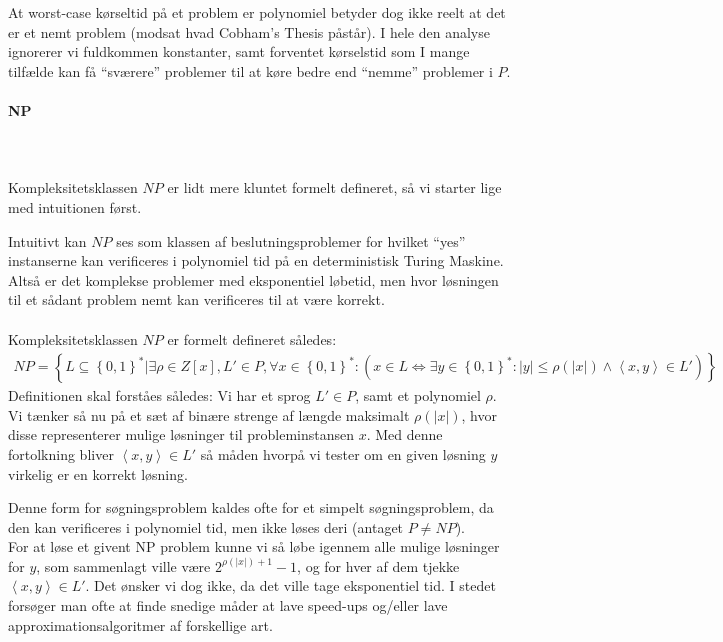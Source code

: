 At worst-case kørseltid på et problem er polynomiel betyder dog ikke reelt at det er et nemt problem (modsat hvad Cobham's Thesis påstår). I hele den analyse ignorerer vi fuldkommen konstanter, samt forventet kørselstid som I mange tilfælde kan få ``sværere'' problemer til at køre bedre end ``nemme'' problemer i $P$.


\paragraph{NP}
~\\
~\\
Kompleksitetsklassen $NP$ er lidt mere kluntet formelt defineret, så vi starter lige med intuitionen først.

Intuitivt kan $NP$ ses som klassen af beslutningsproblemer for hvilket ``yes'' instanserne kan verificeres i polynomiel tid på en deterministisk Turing Maskine. Altså er det komplekse problemer med eksponentiel løbetid, men hvor løsningen til et sådant problem nemt kan verificeres til at være korrekt.\\
~\\
Kompleksitetsklassen $NP$ er formelt defineret således:
\begin{align*}
 NP = \left\lbrace L \subseteq \left\lbrace 0,1 \right\rbrace^* | \exists \rho \in Z[x], L' \in P, \forall x \in \left\lbrace 0,1 \right\rbrace^* : ( x \in L \Leftrightarrow \exists y \in \left\lbrace 0,1 \right\rbrace^* : |y| \leq \rho(|x|) \wedge \left\langle x,y \right\rangle \in L') \right\rbrace
\end{align*}
Definitionen skal forståes således: Vi har et sprog $L' \in P$, samt et polynomiel $\rho$. Vi tænker så nu på et sæt af binære strenge af længde maksimalt $\rho(|x|)$, hvor disse representerer mulige løsninger til probleminstansen $x$. Med denne fortolkning bliver $\left\langle x,y \right\rangle \in L'$ så måden hvorpå vi tester om en given løsning $y$ virkelig er en korrekt løsning. 

Denne form for søgningsproblem kaldes ofte for et simpelt søgningsproblem, da den kan verificeres i polynomiel tid, men ikke løses deri (antaget $P \neq NP$).\\

For at løse et givent NP problem kunne vi så løbe igennem alle mulige løsninger for $y$, som sammenlagt ville være $2^{\rho(|x|)+1}-1$, og for hver af dem tjekke $\left\langle x,y \right\rangle \in L'$. Det ønsker vi dog ikke, da det ville tage eksponentiel tid. I stedet forsøger man ofte at finde snedige måder at lave speed-ups og/eller lave approximationsalgoritmer af forskellige art.

